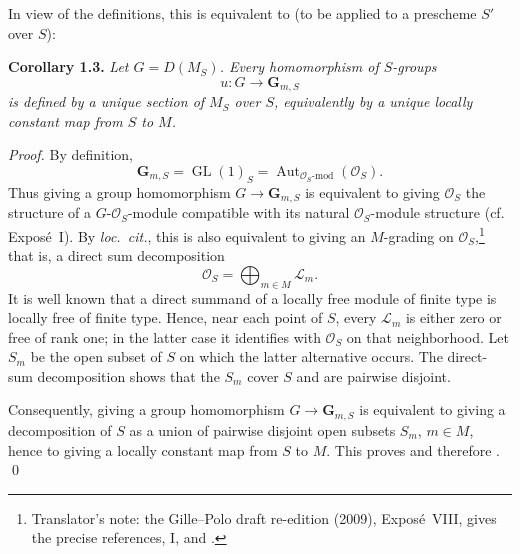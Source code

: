 In view of the definitions, this is equivalent to 
(to be applied to a prescheme \(S'\) over \(S\)):

\medskip
\noindent{}\textbf{Corollary 1.3.}
\textit{Let \(G=D(M_S)\). Every homomorphism of \(S\)-groups}
\[
  u:G\longrightarrow\mathbf G_{m,S}
\]
\textit{is defined by a unique section of \(M_S\) over \(S\), equivalently
by a unique locally constant map from \(S\) to \(M\).}

\emph{Proof.}
By definition,
\[
  \mathbf G_{m,S}
  =\operatorname{GL}(1)_S
  =\operatorname{Aut}_{\mathscr O_S\text{-}\mathrm{mod}}(\mathscr O_S).
\]
Thus giving a group homomorphism \(G\to\mathbf G_{m,S}\) is equivalent to
giving \(\mathscr O_S\) the structure of a
\(G\)-\(\mathscr O_S\)-module compatible with its natural
\(\mathscr O_S\)-module structure (cf. Expos\'e~I). By \emph{loc.\ cit.}, this is also
equivalent to giving an \(M\)-grading on \(\mathscr O_S\),\footnote{Translator's note: the
Gille--Polo draft re-edition (2009), Expos\'e~VIII, gives the precise references, I,
 and .} that is, a direct
sum decomposition
\[
  \mathscr O_S=\bigoplus_{m\in M}\mathscr L_m.
\]
It is well known that a direct summand of a locally free module of finite
type is locally free of finite type. Hence, near each point of \(S\), every
\(\mathscr L_m\) is either zero or free of rank one; in the latter case it
identifies with \(\mathscr O_S\) on that neighborhood. Let \(S_m\) be the
open subset of \(S\) on which the latter alternative occurs. The direct-sum
decomposition shows that the \(S_m\) cover \(S\) and are pairwise disjoint.

Consequently, giving a group homomorphism \(G\to\mathbf G_{m,S}\) is
equivalent to giving a decomposition of \(S\) as a union of pairwise
disjoint open subsets \(S_m\), \(m\in M\), hence to giving a locally
constant map from \(S\) to \(M\). This proves  and therefore
. \qed

